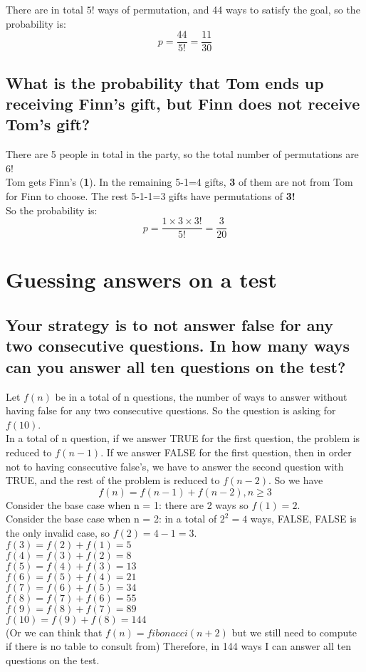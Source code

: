 \documentclass{article}
\begin{document}
There are in total \( 5! \) ways of permutation, and 44 ways to satisfy the goal, so the probability is:
\[
p = \frac{44}{5!} = \frac{11}{30}
\]

\subsection{What is the probability that Tom ends up receiving Finn's gift, but Finn does not receive Tom's gift?}

There are 5 people in total in the party, so the total number of permutations are 6! \\
Tom gets Finn's (\textbf{1}). In the remaining 5-1=4 gifts, \textbf{3} of them are not from Tom for Finn to choose. The rest 5-1-1=3 gifts have permutations of \textbf{3!}\\
So the probability is:
\[
p = \frac{1 \times 3 \times 3! }{5!} = \frac{3}{20}
\]

\section{Guessing answers on a test}

\subsection{Your strategy is to not answer false for any two consecutive questions. In how many ways can you answer all ten questions on the test?}

Let \( f(n) \) be in a total of n questions, the number of ways to answer without having false for any two consecutive questions. So the question is asking for \( f(10) \). \\
In a total of n question, if we answer TRUE for the first question, the problem is reduced to \( f(n-1) \). If we answer FALSE for the first question, then in order not to having consecutive false's, we have to answer the second question with TRUE, and the rest of the problem is reduced to \( f(n-2) \). So we have 
\[
f(n) = f(n-1) + f(n-2), n \geq 3 
\]
Consider the base case when n = 1: there are 2 ways so \( f(1) = 2 \). \\
Consider the base case when n = 2: in a total of \( 2^2 = 4 \) ways, FALSE, FALSE is the only invalid case, so \( f(2) = 4 - 1 = 3\). \\
\( f(3) = f(2) + f(1) = 5 \) \\ 
\( f(4) = f(3) + f(2) = 8 \) \\ 
\( f(5) = f(4) + f(3) = 13 \) \\ 
\( f(6) = f(5) + f(4) = 21 \) \\ 
\( f(7) = f(6) + f(5) = 34 \) \\ 
\( f(8) = f(7) + f(6) = 55 \) \\ 
\( f(9) = f(8) + f(7) = 89 \) \\ 
\( f(10) = f(9) + f(8) = 144 \) \\
 (Or we can think that \(f(n) = fibonacci(n+2) \) but we still need to compute if there is no table to consult from)
 Therefore, in 144 ways I can answer all ten questions on the test.
\end{document}
